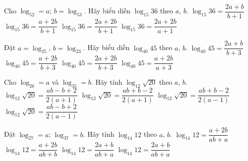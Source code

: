 \begin{ex}%
	Cho $\log_52=a$; $b=\log_53$. Hãy biểu diễn $\log_{15}36$ theo $a$, $b$. 
	\choice
	{$\log_{15}36=\dfrac{2a+b}{b+1}$}
	{$\log_{15}36=\dfrac{a+2b}{b+1}$}
	{\True $\log_{15}36=\dfrac{2a+2b}{b+1}$}
	{$\log_{15}36=\dfrac{2a+2b}{a+1}$}
\end{ex}

\begin{ex}%
	Đặt $a=\log_25$, $b=\log_23$. Hãy biểu diễn $\log_{40}45$ theo $a$, $b$.
	\choice
	{$\log_{40}45=\dfrac{2a+b}{b+3}$}
	{$\log_{40}45=\dfrac{a+2b}{b+3}$}
	{$\log_{40}45=\dfrac{2a+2b}{b+3}$}
	{\True $\log_{40}45=\dfrac{a+2b}{a+3}$}
\end{ex}

\begin{ex}%
	Cho $\log_26=a$ và $\log_35=b$. Hãy tính $\log_{12}\sqrt{20}$ theo $a$, $b$.
	\choice
	{\True $\log_{12}\sqrt{20}=\dfrac{ab-b+2}{2(a+1)}$}
	{$\log_{12}\sqrt{20}=\dfrac{ab+b-2}{2(a+1)}$}
	{$\log_{12}\sqrt{20}=\dfrac{ab+b-2}{2(a-1)}$}
	{$\log_{12}\sqrt{20}=\dfrac{ab-b+2}{2(a-1)}$}
\end{ex}

\begin{ex}%
	Đặt $\log_27=a$; $\log_37=b$. Hãy tính $\log_{14}12$ theo $a$, $b$.
	\choice
	{$\log_{14}12=\dfrac{a+2b}{ab+a}$}
	{\True $\log_{14}12=\dfrac{a+2b}{ab+b}$}
	{$\log_{14}12=\dfrac{2a+b}{ab+a}$}
	{$\log_{14}12=\dfrac{2a+b}{ab+a}$}
\end{ex}

